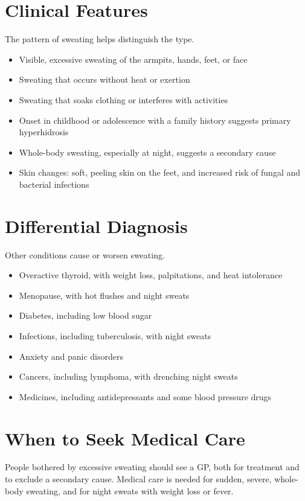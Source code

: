 \section*{Clinical Features}
The pattern of sweating helps distinguish the type.
\begin{itemize}
    \item Visible, excessive sweating of the armpits, hands, feet, or face
    \item Sweating that occurs without heat or exertion
    \item Sweating that soaks clothing or interferes with activities
    \item Onset in childhood or adolescence with a family history suggests primary hyperhidrosis
    \item Whole-body sweating, especially at night, suggests a secondary cause
    \item Skin changes: soft, peeling skin on the feet, and increased risk of fungal and bacterial infections
\end{itemize}

\section*{Differential Diagnosis}
Other conditions cause or worsen sweating.
\begin{itemize}
    \item Overactive thyroid, with weight loss, palpitations, and heat intolerance
    \item Menopause, with hot flushes and night sweats
    \item Diabetes, including low blood sugar
    \item Infections, including tuberculosis, with night sweats
    \item Anxiety and panic disorders
    \item Cancers, including lymphoma, with drenching night sweats
    \item Medicines, including antidepressants and some blood pressure drugs
\end{itemize}

\section*{When to Seek Medical Care}
People bothered by excessive sweating should see a GP, both for treatment and to exclude a secondary cause. Medical care is needed for sudden, severe, whole-body sweating, and for night sweats with weight loss or fever.

